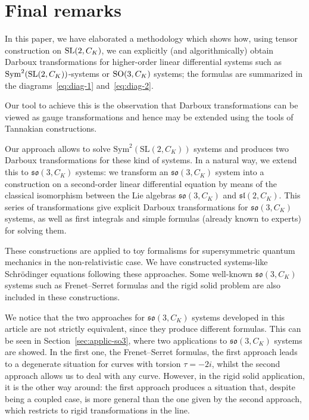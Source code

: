 \documentclass[pdftex]{sigma}%
\numberwithin{equation}{section}
\def\Sym{\mathrm{Sym}}
\begin{document}
\section{Final remarks}

In this paper, we have elaborated a methodology which shows how, using tensor construction on ${\rm SL}(2, C_K)$, we can explicitly (and algorithmically) obtain Darboux transformations for higher-order linear differential systems such as $\Sym^2({\rm SL}(2, C_K))$-systems or ${\rm SO}(3,C_K)$ systems; the formulas are summarized in the diagrams~\eqref{eq:diag-1} and~\eqref{eq:diag-2}.

Our tool to achieve this is the observation that Darboux transformations can be viewed as gauge transformations and hence may be extended using the tools of Tannakian constructions.

Our approach allows to solve $\Sym^2(\mathrm{SL}(2, C_K))$ systems and produces two Darboux transformations for these kind of systems. In a natural way, we extend this to $\mathfrak{so}(3, C_K)$ systems: we transform an $\mathfrak{so}(3, C_K)$ system into a construction on a second-order linear differential equation by means of the classical isomorphism between the Lie algebras $\mathfrak{so}(3, C_K)$ and $\mathfrak{sl} (2, C_K)$.
This series of transformations give explicit Darboux transformations for $\mathfrak{so}(3, C_K)$ systems, as well as first integrals and simple formulas (already known to experts) for solving them.

These constructions are applied to toy formalisms for supersymmetric quantum mechanics in the non-relativistic case. We have constructed systems-like Schr\"odinger equations following these approaches.
Some well-known $\mathfrak{so}(3, C_K)$ systems such as Frenet--Serret formulas and the rigid solid problem are also included in these constructions.


We notice that the two approaches for $\mathfrak{so}(3, C_K)$ systems developed in this article are not strictly equivalent, since they produce different formulas. This can be seen in Section~\ref{sec:applic-so3}, where two applications to $\mathfrak{so}(3, C_K)$ systems are showed. In the first one, the Frenet--Serret formulas, the first approach leads to a degenerate situation for curves with torsion $\tau= -2i$, whilst the second approach allows us to deal with any curve. However, in the rigid solid application, it is the other way around: the first approach produces a situation that, despite being a coupled case, is more general than the one given by the second approach, which restricts to rigid transformations in the line.
\end{document}

